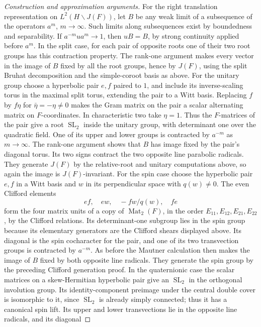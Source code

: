 \documentclass[11pt,a4paper,openany,oneside]{book}
\theoremstyle{resultstyle}
\theoremstyle{definition}
\numberwithin{equation}{chapter}
\begin{document}
\begin{proof}[Construction and approximation arguments]
For the right translation representation on
\(L^2(H\backslash J(F))\), let \(B\) be any weak limit of a
subsequence of the operators \(a^m\), \(m\to\infty\).
Such limits along subsequences exist by boundedness and
separability. If \(a^{-m}u a^m\to1\), then \(uB=B\), by
strong continuity applied before \(a^m\). In the split case, for each pair
of opposite roots one of their two root groups has this
contraction property. The rank-one argument makes every
vector in the image of \(B\) fixed by all the root groups,
hence by \(J(F)\), using the split Bruhat decomposition
and the simple-coroot basis as above.
For the unitary group choose a hyperbolic pair \(e,f\)
paired to \(1\), and include its inverse-scaling
torus in the maximal split torus, extending the pair
to a Witt basis. Replacing \(f\) by \(f\eta\) for
\(\bar\eta=-\eta\ne0\) makes the Gram matrix on the
pair a scalar alternating matrix on \(F\)-coordinates.
In characteristic two take \(\eta=1\).
Thus the \(F\)-matrices of the pair give a root
\(\operatorname{SL}_2\) inside the unitary group,
with determinant one over the quadratic field.
One of its upper and lower groups is contracted by
\(a^{-m}\) as \(m\to\infty\). The rank-one argument
shows that \(B\) has image fixed by the pair's diagonal
torus. Its two signs contract the two opposite line
parabolic radicals. They generate \(J(F)\) by the
relative-root and unitary computations above, so again
the image is \(J(F)\)-invariant.
For the spin case choose the hyperbolic pair \(e,f\)
in a Witt basis and \(w\) in its perpendicular space
with \(q(w)\ne0\). The even Clifford elements
\[
 ef,\quad ew,\quad -fw/q(w),\quad fe
\]
form the four matrix units of a copy of
\(\operatorname{Mat}_2(F)\), in the order
\(E_{11},E_{12},E_{21},E_{22}\), by the Clifford
relations. Its determinant-one subgroup lies in the
spin group because its elementary generators are the
Clifford shears displayed above. Its diagonal is the
spin cocharacter for the pair, and one of its two
transvection groups is contracted by \(a^{-m}\).
As before the Mautner calculation then makes the
image of \(B\) fixed by both opposite line radicals.
They generate the spin group by the preceding
Clifford generation proof. In the quaternionic
case the scalar matrices on a skew-Hermitian
hyperbolic pair give an \(\operatorname{SL}_2\)
in the orthogonal involution group. Its
identity-component preimage under the central
double cover is isomorphic to it, since
\(\operatorname{SL}_2\) is already simply
connected; thus it has a canonical spin lift.
Its upper and lower transvections lie in the
opposite line radicals, and its diagonal

\end{proof}
\end{document}
